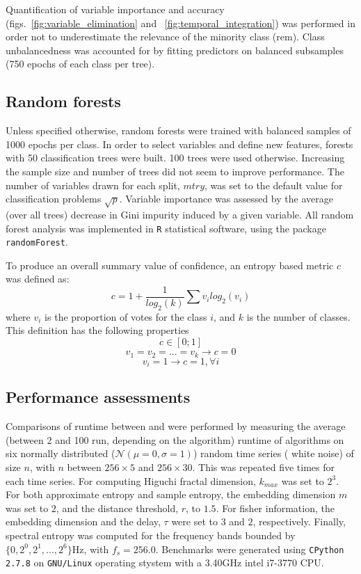 Quantification of variable importance and accuracy (figs.~\ref{fig:variable_elimination} and ~\ref{fig:temporal_integration}) was performed in order not to underestimate the relevance of the minority class (\gls{rem}).
Class  unbalancedness was accounted for by fitting predictors on balanced subsamples (750 epochs of each class per tree).


\subsection{Random forests}
Unless specified otherwise, random forests \citationneeded{} were trained with balanced samples of 1000 epochs per class.
In order to select variables and define new features, forests with 50 classification trees were built.
100 trees were used otherwise.
Increasing the sample size and number of trees did not seem to improve performance.
The number of variables drawn for each split, $mtry$, was set to the default value for classification problems $\sqrt{p}$.
Variable importance was assessed by the average (over all trees) decrease in Gini impurity induced by a given variable.
All random forest analysis was implemented in \texttt{R} \citationneeded{} statistical software, using the package \texttt{randomForest}.

To produce an overall summary value of confidence, an entropy based metric $c$ was defined as:
\begin{equation}
c = 1 + \frac{1}{log_2(k)}\sum{v_i  log_2(v_i)}
\label{eq:entropy}
\end{equation}
where $v_i$ is the proportion of votes for the class $i$, and $k$ is the number of classes. 
This definition has the following properties 
\[
c \in [0;1]
\]
\[
v_1 = v_2 = ... = v_k \rightarrow c = 0
\]
\[
v_i = 1 \rightarrow c = 1 , \forall i
\]




\subsection{Performance assessments}
Comparisons of runtime between \pr{} and \pyeeg{} were performed by measuring the average (between 2 and 100 run, depending on the algorithm) runtime of algorithms on six
normally distributed ($\mathcal{N}(\mu=0,\sigma=1)$) random time series (\ie{} white noise) of size $n$,
with $n$ between $256 \times{} 5$ and $256 \times{} 30$.
This was repeated five times for each time series.
For computing  Higuchi fractal dimension, $k_{max}$ was set to $2^3$.
For both approximate entropy and sample entropy, the embedding dimension $m$ was set to $2$, and the distance threshold, $r$, to $1.5$.
For fisher information, the embedding dimension and the delay, $\tau$ were set to $3$ and $2$, respectively.
Finally, spectral entropy was computed for the frequency bands bounded by $\{0, 2^0, 2^1, ..., 2^6\}$Hz, with $f_s = 256.0$.
Benchmarks were generated using \texttt{CPython 2.7.8} on \texttt{GNU/Linux} operating stystem with a 3.40GHz intel i7-3770 CPU.

